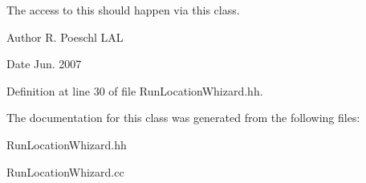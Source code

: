 The access to this should happen via this class. 

\begin{DoxyAuthor}{Author}
R. Poeschl L\-A\-L 
\end{DoxyAuthor}
\begin{DoxyDate}{Date}
Jun. 2007 
\end{DoxyDate}


Definition at line 30 of file Run\-Location\-Whizard.\-hh.



The documentation for this class was generated from the following files\-:\begin{DoxyCompactItemize}
\item 
Run\-Location\-Whizard.\-hh\item 
Run\-Location\-Whizard.\-cc\end{DoxyCompactItemize}
